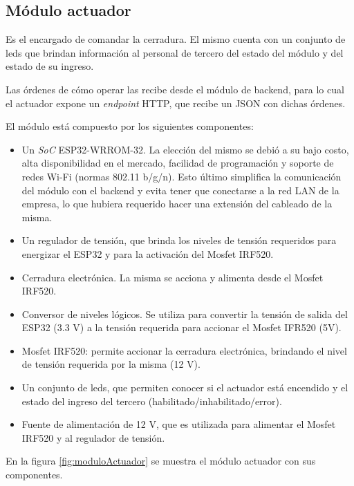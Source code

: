 \subsection{Módulo actuador}

Es el encargado de comandar la cerradura. El mismo cuenta con un conjunto de leds que brindan información al personal de tercero del estado del módulo y del estado de su ingreso.

Las órdenes de cómo operar las recibe desde el módulo de backend, para lo cual el actuador expone un \textit{endpoint} HTTP, que recibe un JSON con dichas órdenes.

\pagebreak
El módulo está compuesto por los siguientes componentes:

\begin{itemize}
\item Un \textit{SoC} ESP32-WRROM-32. La elección del mismo se debió a su bajo costo, alta disponibilidad en el mercado, facilidad de programación y soporte de redes Wi-Fi (normas 802.11 b/g/n). Esto último simplifica la comunicación del módulo con el backend y evita tener que conectarse a la red LAN de la empresa, lo que hubiera requerido hacer una extensión del cableado de la misma.
\item Un regulador de tensión, que brinda los niveles de tensión requeridos para energizar el ESP32 y para la activación del Mosfet IRF520. 
\item Cerradura electrónica. La misma se acciona y alimenta desde el Mosfet IRF520.
\item Conversor de niveles lógicos. Se utiliza para convertir la tensión de salida del ESP32 (3.3 V) a la tensión requerida para accionar el Mosfet IFR520 (5V).
\item Mosfet IRF520: permite accionar la cerradura electrónica, brindando el nivel de tensión requerida por la misma (12 V).
\item Un conjunto de leds, que permiten conocer si el actuador está encendido y el estado del ingreso del tercero (habilitado/inhabilitado/error).
\item Fuente de alimentación de 12 V, que es utilizada para alimentar el  Mosfet IRF520 y al regulador de tensión.
\end{itemize}

En la figura \ref{fig:moduloActuador} se muestra el módulo actuador con sus componentes.

